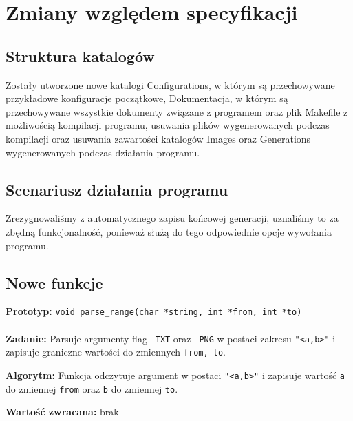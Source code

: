 \documentclass[12pt,a4paper,notitlepage]{report}
\begin{document}
\section{Zmiany względem specyfikacji}
\subsection{Struktura katalogów}
Zostały utworzone nowe katalogi Configurations, w którym są przechowywane przykładowe konfiguracje początkowe, Dokumentacja, w którym są przechowywane wszystkie dokumenty związane z programem oraz plik Makefile z możliwością kompilacji programu, usuwania plików wygenerowanych podczas kompilacji oraz usuwania zawartości katalogów Images oraz Generations wygenerowanych podczas działania programu.

\subsection{Scenariusz działania programu}
Zrezygnowaliśmy z automatycznego zapisu końcowej generacji, uznaliśmy to za zbędną funkcjonalność, ponieważ służą do tego odpowiednie opcje wywołania programu.

\subsection{Nowe funkcje}
\textbf{Prototyp:} \verb|void parse_range(char *string, int *from, int *to)|\\
\\
\textbf{Zadanie:} Parsuje argumenty flag \verb|-TXT| oraz \verb|-PNG| w postaci zakresu \verb|"<a,b>"| i zapisuje graniczne wartości do zmiennych \verb|from, to|.
\begin{flushleft}
\textbf{Algorytm:}
Funkcja odczytuje argument w postaci \verb|"<a,b>"| i zapisuje wartość \verb|a| do zmiennej \verb|from| oraz \verb|b| do zmiennej \verb|to|.\\
\end{flushleft}
\begin{flushleft}
\textbf{Wartość zwracana:} brak
\end{flushleft}
\end{document}
